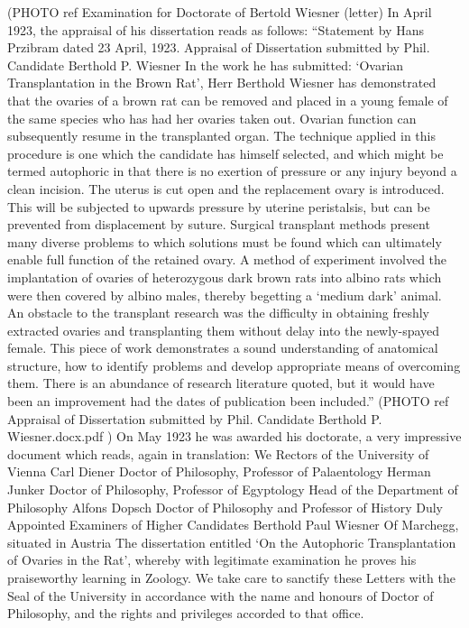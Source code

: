 (PHOTO ref Examination for Doctorate of Bertold Wiesner (letter)
In April 1923, the appraisal of his dissertation reads as follows:
“Statement by Hans Przibram dated 23 April, 1923.
Appraisal of Dissertation submitted by Phil. Candidate Berthold P. Wiesner In the work he has
submitted: ‘Ovarian Transplantation in the Brown Rat’, Herr Berthold Wiesner has demonstrated
that the ovaries of a brown rat can be removed and placed in a young female of the same species
who has had her ovaries taken out. Ovarian function can subsequently resume in the transplanted
organ. The technique applied in this procedure is one which the candidate has himself selected, and
which might be termed autophoric in that there is no exertion of pressure or any injury beyond a
clean incision. The uterus is cut open and the replacement ovary is introduced. This will be
subjected to upwards pressure by uterine peristalsis, but can be prevented from displacement by
suture. Surgical transplant methods present many diverse problems to which solutions must be
found which can ultimately enable full function of the retained ovary. A method of experiment
involved the implantation of ovaries of heterozygous dark brown rats into albino rats which were
then covered by albino males, thereby begetting a ‘medium dark’ animal. An obstacle to the
transplant research was the difficulty in obtaining freshly extracted ovaries and transplanting them
without delay into the newly-spayed female. This piece of work demonstrates a sound
understanding of anatomical structure, how to identify problems and develop appropriate means of
overcoming them. There is an abundance of research literature quoted, but it would have been an
improvement had the dates of publication been included.”
(PHOTO ref Appraisal of Dissertation submitted by Phil. Candidate Berthold P. Wiesner.docx.pdf )
On May 1923 he was awarded his doctorate, a very impressive document which reads, again in
translation:
We Rectors of the University of Vienna
Carl Diener
Doctor of Philosophy, Professor of Palaentology
Herman Junker
Doctor of Philosophy, Professor of Egyptology
Head of the Department of Philosophy
Alfons Dopsch
Doctor of Philosophy and Professor of History
Duly Appointed Examiners of Higher Candidates
Berthold Paul Wiesner
Of Marchegg, situated in Austria
The dissertation entitled ‘On the Autophoric Transplantation of Ovaries in the Rat’, whereby with
legitimate examination he proves his praiseworthy learning in Zoology.
We take care to sanctify these Letters with the Seal of the University in accordance with the name
and honours of Doctor of Philosophy, and the rights and privileges accorded to that office.
